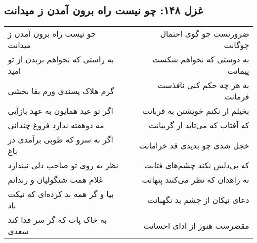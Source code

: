 \begin{center}
\section*{غزل ۱۴۸: چو نیست راه برون آمدن ز میدانت}
\label{sec:148}
\begin{longtable}{l p{0.5cm} r}
چو نیست راه برون آمدن ز میدانت
&&
ضرورتست چو گوی احتمال چوگانت
\\
به راستی که نخواهم بریدن از تو امید
&&
به دوستی که نخواهم شکست پیمانت
\\
گرم هلاک پسندی ورم بقا بخشی
&&
به هر چه حکم کنی نافذست فرمانت
\\
اگر تو عید همایون به عهد بازآیی
&&
بخیلم ار نکنم خویشتن به قربانت
\\
مه دوهفته ندارد فروغ چندانی
&&
که آفتاب که می‌تابد از گریبانت
\\
اگر نه سرو که طوبی برآمدی در باغ
&&
خجل شدی چو بدیدی قد خرامانت
\\
نظر به روی تو صاحب دلی نیندازد
&&
که بی‌دلش نکند چشم‌های فتانت
\\
غلام همت شنگولیان و رندانم
&&
نه زاهدان که نظر می‌کنند پنهانت
\\
بیا و گر همه بد کرده‌ای که نیکت باد
&&
دعای نیکان از چشم بد نگهبانت
\\
به خاک پات که گر سر فدا کند سعدی
&&
مقصرست هنوز از ادای احسانت
\\
\end{longtable}
\end{center}
